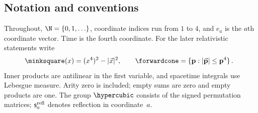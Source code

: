 \subsection{Notation and conventions}

Throughout, $\N=\{0,1,\ldots\}$, coordinate indices run from $1$ to $4$, and $e_a$ is the $a$th coordinate vector. Time is the fourth coordinate. For the later relativistic statements write
\begin{equation*}
\minksquare(x)=(x^4)^2-|\vec x|^2,\qquad
\forwardcone=\{\mathbf p:|\vec{\mathbf p}|\le\mathbf p^4\}\,.
\end{equation*}
Inner products are antilinear in the first variable, and spacetime integrals use Lebesgue measure. Arity zero is included; empty sums are zero and empty products are one. The group $\hypercubic$ consists of the signed permutation matrices; $\mathsf s_a^{\rm refl}$ denotes reflection in coordinate~$a$.
